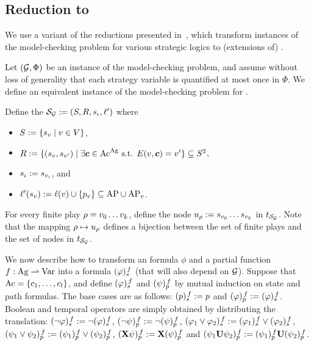 \subsection{Reduction to \QCTLs}
\label{sec-reduction}

We use a variant of the reductions presented
in~\cite{DBLP:journals/iandc/LaroussinieM15,DBLP:conf/csl/FijalkowMMR18,BMMRV17,DBLP:conf/kr/MaubertM18,DBLP:conf/ijcai/BouyerKMMMP19},
which transform instances of the model-checking problem for various
strategic logics to (extensions of) \QCTLs.

Let $(\CGS,\Phi)$ be an instance of the \SL
model-checking problem, and assume without loss of generality that
each strategy variable is quantified at most once in $\Phi$. We define an equivalent instance of the
model-checking problem for \QCTLs.

Define the \KS $\KS_{\CGS}\egdef(\setstates,\relation,\sstate_{\init},\lab')$ where
\begin{itemize}
\item $\setstates\egdef\{\sstate_{\pos} \mid \pos\in\setpos\}$,
\item $\relation\egdef\{(\sstate_{\pos},\sstate_{\pos'})\mid
  \exists\jmov\in\Mov^{\Agf} \mbox{ s.t. }\trans(\pos,\jmov)=\pos'\}
  \subseteq \setstates^2$,
  \item $\sstate_{\init}\egdef\sstate_{\pos_{\init}}$, and
\item $\lab'(\sstate_{\pos})\egdef\val(\pos)\union \{p_{\pos}\} \subseteq \APf \cup \APv$.
\end{itemize}



For every finite play $\fplay=\pos_{0}\ldots\pos_{k}$, define
the node $\noeud_{\fplay}\egdef \sstate_{\pos_{0}}\ldots \sstate_{\pos_{k}}$ in
$\unfold[\KS_{\CGS}]{\sstate_{\pos_{0}}}$.  Note that the mapping
$\fplay\mapsto\noeud_{\fplay}$ defines a bijection between the set
of finite plays and the set of
nodes in $\unfold[\KS_{\CGS}]{\sstate_{\init}}$. %


\halfline
{}
 We now describe how to transform an \SLref formula $\phi$ and a partial
function $f:\Agf \partialto  \Varf$ into a \QCTLs
formula $\tr[f]{\phi}$ (that will also depend on $\CGS$).
Suppose that $\Mov=\{\mov_{1},\ldots,\mov_{\maxmov}\}$, and define
$\tr[f]{\phi}$ and $\trp[f]{\psi}$ by mutual induction on state and path formulas. 
The base cases are as follows:
$\tr[f]{p} 		 \egdef p$ and $\trp[f]{\phi} \egdef
\tr[f]{\phi}$. Boolean and temporal operators are simply obtained by
distributing the translation:
$\tr[f]{\neg \phi} 	 \egdef \neg \tr[f]{\phi}$, $\trp[f]{\neg
  \psi} \egdef \neg \trp[f]{\psi}$,
$\tr[f]{\phi_1\ou\phi_2}  \egdef \tr[f]{\phi_1}\ou\tr[f]{\phi_2}$,
$\trp[f]{\psi_1\ou\psi_2}  \egdef \trp[f]{\psi_1}\ou\trp[f]{\psi_2}$,
$\trp[f]{\X\psi}  \egdef \X\trp[f]{\psi}$ and $\trp[f]{\psi_1\until\psi_2}  \egdef \trp[f]{\psi_1}\until\trp[f]{\psi_2}$.


